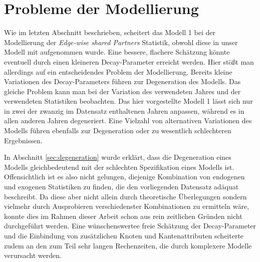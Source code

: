 \documentclass[a4paper,ngerman,oneside,titlepage,bibliography=totoc,11pt]{scrreprt}
\begin{document}
\section{Probleme der Modellierung}
 Wie im letzten Abschnitt beschrieben, scheitert das Modell 1 bei der Modellierung der \emph{Edge-wise shared Partners} Statistik, obwohl diese in unser Modell mit aufgenommen wurde. Eine bessere, flachere Schätzung könnte eventuell durch einen kleineren Decay-Parameter erreicht werden. Hier stößt man allerdings auf ein entscheidendes Problem der Modellierung. Bereits kleine Variationen des Decay-Parameters führen zur Degeneration des Modells. Das gleiche Problem kann man bei der Variation des verwendeten Jahres und der verwendeten Statistiken beobachten. Das hier vorgestellte Modell 1 lässt sich nur in zwei der zwanzig im Datensatz enthaltenen Jahren anpassen, während es in allen anderen Jahren degeneriert. Eine Vielzahl von alternativen Variationen des Modells führen ebenfalls zur Degeneration oder zu wesentlich schlechteren Ergebnissen.

In Abschnitt \ref{sec:degeneration} wurde erklärt, dass die Degeneration eines Modells gleichbedeutend mit der schlechten Spezifikation eines Modells ist. Offensichtlich ist es also nicht gelungen, diejenige Kombination von endogenen und exogenen Statistiken zu finden, die den vorliegenden Datensatz adäquat beschreibt. Da diese aber nicht allein durch theoretische Überlegungen sondern vielmehr durch Ausprobieren verschiedenster Kombinationen zu ermitteln wäre, konnte dies im Rahmen dieser Arbeit schon aus rein zeitlichen Gründen nicht durchgeführt werden. Eine wünschenswertee freie Schätzung der Decay-Parameter und die Einbindung von zusätzlichen Knoten und Kantenattributen scheiterte zudem an den zum Teil sehr langen Rechenzeiten, die durch komplexere Modelle verursacht werden.
\end{document}
